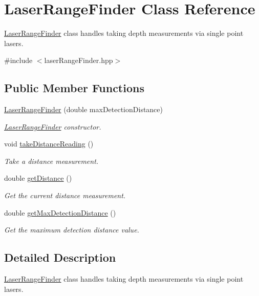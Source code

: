 \hypertarget{classLaserRangeFinder}{\section{Laser\-Range\-Finder Class Reference}
\label{classLaserRangeFinder}
}


\hyperlink{classLaserRangeFinder}{Laser\-Range\-Finder} class handles taking depth measurements via single point lasers.  




{\ttfamily \#include $<$laser\-Range\-Finder.\-hpp$>$}

\subsection*{Public Member Functions}
\begin{DoxyCompactItemize}
\item 
\hyperlink{classLaserRangeFinder_afa7430aa594faa99f17fbefedf70e43c}{Laser\-Range\-Finder} (double max\-Detection\-Distance)
\begin{DoxyCompactList}\small\item\em \hyperlink{classLaserRangeFinder}{Laser\-Range\-Finder} constructor. \end{DoxyCompactList}\item 
void \hyperlink{classLaserRangeFinder_ae0bea05c6342ada9741cc7a8db401de4}{take\-Distance\-Reading} ()
\begin{DoxyCompactList}\small\item\em Take a distance measurement. \end{DoxyCompactList}\item 
double \hyperlink{classLaserRangeFinder_a6b147c92e249c0d3b5ac42c030e74155}{get\-Distance} ()
\begin{DoxyCompactList}\small\item\em Get the current distance measurement. \end{DoxyCompactList}\item 
double \hyperlink{classLaserRangeFinder_a6282f3a200ab7960c3050f2ee88a42c2}{get\-Max\-Detection\-Distance} ()
\begin{DoxyCompactList}\small\item\em Get the maximum detection distance value. \end{DoxyCompactList}\end{DoxyCompactItemize}


\subsection{Detailed Description}
\hyperlink{classLaserRangeFinder}{Laser\-Range\-Finder} class handles taking depth measurements via single point lasers. 

